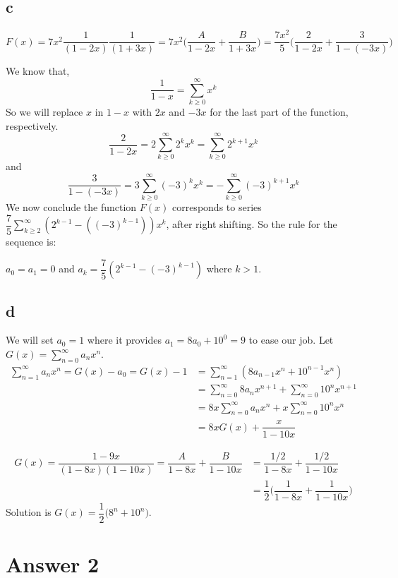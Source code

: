 \documentclass[12pt]{article}
\begin{document}
\subsection*{c}
\begin{center}
    $F(x) = 7x^2 \dfrac{1}{(1-2x)} \dfrac{1}{(1+3x)} = 7x^2\bigg(\dfrac{A}{1-2x}+\dfrac{B}{1+3x}\bigg)=\dfrac{7x^2}{5}\bigg(\dfrac{2}{1-2x}+\dfrac{3}{1-(-3x)}\bigg)$
\end{center}
We know that,
    $$\dfrac{1}{1-x} = \sum_{k\geq0}^{\infty} x^k$$
So we will replace $x$ in $1-x$ with $2x$ and $-3x$ for the last part of the function, respectively.
    $$\dfrac{2}{1-2x} = 2\sum_{k\geq0}^{\infty} 2^k x^k = \sum_{k\geq0}^{\infty} 2^{k+1} x^k$$
and
    $$\dfrac{3}{1-(-3x)} = 3\sum_{k\geq0}^{\infty} (-3)^k x^k = -\sum_{k\geq0}^{\infty} (-3)^{k+1} x^k$$
We now conclude the function $F(x)$ corresponds to series $\dfrac{7}{5} \sum_{k\geq2}^{\infty} (2^{k-1}-((-3)^{k-1})) x^{k}$, after right shifting. So the rule for the sequence is:
\begin{center}
    $a_0 = a_1 = 0$ and $a_k = \dfrac{7}{5}(2^{k-1}-(-3)^{k-1})$ where $k>1$.
\end{center}
\subsection*{d}
We will set $a_0 = 1$ where it provides $a_1 = 8a_0 + 10^0 = 9$ to ease our job. Let $G(x) = \sum_{n=0}^{\infty}a_n x^n$.
\begin{align*}
    \sum_{n=1}^{\infty} a_n x^n = G(x) - a_0 = G(x) - 1 &= \sum_{n=1}^{\infty}(8a_{n-1}x^n + 10^{n-1}x^n) \\
    &= \sum_{n=0}^{\infty}8a_n x^{n+1} + \sum_{n=0}^{\infty} 10^n x^{n+1} \\
    &= 8x\sum_{n=0}^{\infty}a_n x^n + x\sum_{n=0}^{\infty} 10^n x^n \\
    &= 8xG(x) + \dfrac{x}{1-10x}
\end{align*}
\begin{center}
    \begin{align*}
        G(x) = \dfrac{1-9x}{(1-8x)(1-10x)} = \dfrac{A}{1-8x} + \dfrac{B}{1-10x} &= \dfrac{1/2}{1-8x} + \dfrac{1/2}{1-10x} \\
        &= \dfrac{1}{2}\bigg(\dfrac{1}{1-8x} + \dfrac{1}{1-10x}\bigg)
    \end{align*}
    \bigskip
    Solution is $G(x) = \dfrac{1}{2}\big(8^n + 10^n\big)$.
\end{center}
\newpage
\section*{Answer 2}
\end{document}
